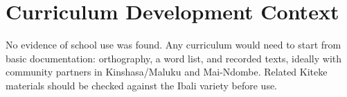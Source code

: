 \documentclass[12pt]{article}
\begin{document}
\section{Curriculum Development Context}
No evidence of school use was found. Any curriculum would need to start from basic documentation: orthography, a word list, and recorded texts, ideally with community partners in Kinshasa/Maluku and Mai-Ndombe. Related Kiteke materials should be checked against the Ibali variety before use.
\end{document}
